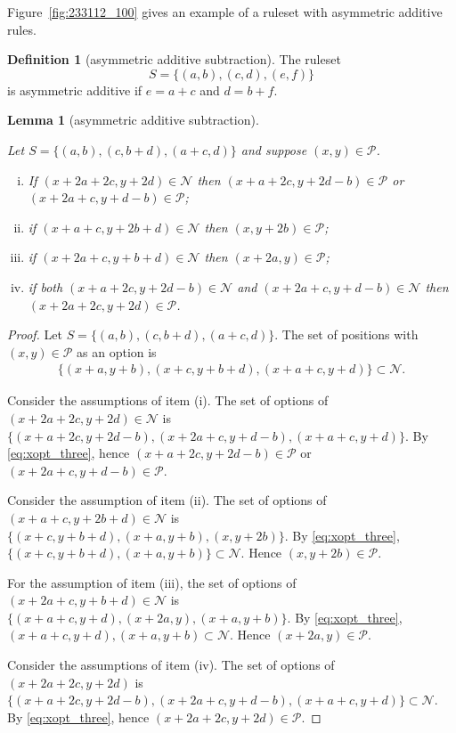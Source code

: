 \documentclass{amsart}
\theoremstyle{plain}
\newtheorem{lem}[thm]{Lemma}
\theoremstyle{definition}
\newtheorem{defi}[thm]{Definition}
\newcommand{\N}{\ensuremath{\mathcal N}}
\renewcommand{\P}{\ensuremath{\mathcal P}}
\begin{document}
Figure~\ref{fig:233112_100} gives an example of a ruleset with {\sc asymmetric additive} rules. 

\begin{defi}[{\sc asymmetric additive subtraction}]
    The ruleset $$S=\{(a,b),(c,d),(e,f)\}$$ is {\sc asymmetric additive} if $e=a+c$ and $d=b+f$.
\end{defi}



\begin{lem}[{\sc asymmetric additive subtraction}]\label{lem:three_move_sum}


Let $S=\{(a,b),(c,b+d), (a+c,d)\}$ and suppose $(x,y)\in\P$. 
\begin{enumerate}[(i)]
\item If  $(x+2a+2c, y+2d) \in \N$  then   $(x+a+2c, y+2d-b) \in \P$ or  $(x+2a+c, y+d-b) \in \P$;
\item if $(x+a+c, y+2b+d) \in \N$ then $(x,y+2b) \in \P$;
\item if  $(x+2a+c, y+b+d) \in \N$ then $(x+2a,y) \in \P$;
\item  if both  $(x+a+2c, y+2d-b) \in \N$ and  $(x+2a+c, y+d-b) \in \N$ then $(x+2a+2c, y+2d) \in \P$.
\end{enumerate}
\end{lem}

\begin{proof}
Let  $S=\{(a,b),(c,b+d),(a+c,d)\}$. The set of positions with $(x,y)\in \P$ as an option is 
\begin{align}\label{eq:xopt_three}
\{(x+a,y+b),(x+c,y+b+d),(x+a+c,y+d)\}\subset \N.
\end{align} 

Consider the assumptions of item (i). The set of options of $(x+2a+2c, y+2d)\in\N$ is 
$\{(x+a+2c,y+2d-b),(x+2a+c,y+d-b),(x+a+c,y+d)\}.
$
By \eqref{eq:xopt_three}, hence $(x+a+2c, y+2d-b) \in \P$ or  $(x+2a+c, y+d-b) \in \P$.

Consider the assumption of item (ii).  The set of options of $(x+a+c , y+2b+d)\in\N$ is 
$\{(x+c,y+b+d),(x+a,y+b),(x,y+2b)\}$.   
By \eqref{eq:xopt_three}, $\{(x+c,y+b+d),(x+a,y+b)\} \subset \N$. Hence $(x,y+2b) \in \P$. 

For the assumption of item (iii), the set of options of $(x+2a+c, y+b+d)\in\N$ is 
$\{(x+a+c,y+d),(x+2a,y),(x+a,y+b)\}$.  
By \eqref{eq:xopt_three}, $(x+a+c,y+d), (x+a,y+b) \subset \N$. Hence  $(x+2a,y) \in \P$.

Consider the assumptions of item (iv). The set of options of $(x+2a+2c, y+2d)$ is $\{(x+a+2c,y+2d-b),(x+2a+c,y+d-b),(x+a+c,y+d)\}\subset \N$. 
By \eqref{eq:xopt_three}, hence $(x+2a+2c, y+2d) \in \P$.
\end{proof}
\end{document}
